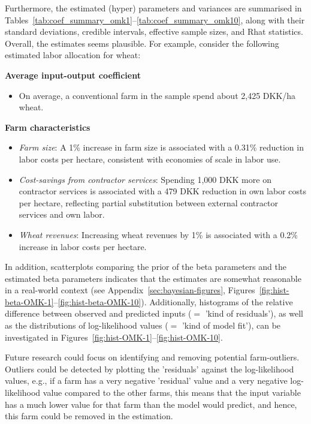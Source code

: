 \documentclass[12pt]{article}
\begin{document}
Furthermore, the estimated (hyper) parameters and variances are summarised in Tables~\ref{tab:coef_summary_omk1}--\ref{tab:coef_summary_omk10}, along with their standard deviations, credible intervals, effective sample sizes, and Rhat statistics.
Overall, the estimates seems plausible. 
For example, consider the following estimated labor allocation for wheat:

\begin{tcolorbox}[
  colback=gray!10,
  colframe=gray!50!black,
  title=Labor Costs--Wheat Estimates,
  fonttitle=\bfseries,
  arc=2mm,
  breakable
]

\noindent\textbf{Average input-output coefficient}
\begin{itemize}
    \item On average, a conventional farm in the sample spend about 2{,}425 DKK/ha wheat. 
\end{itemize}

\noindent\textbf{Farm characteristics}
\begin{itemize}
    \item \textit{Farm size}: A 1\% increase in farm size is associated with a 0.31\% reduction in labor costs per hectare, consistent with economies of scale in labor use.
    \item \textit{Cost-savings from contractor services}: Spending 1{,}000 DKK more on contractor services is associated with a 479 DKK reduction in own labor costs per hectare, reflecting partial substitution between external contractor services and own labor.
    \item \textit{Wheat revenues}: Increasing wheat revenues by 1\% is associated with a 0.2\% increase in labor costs per hectare.
\end{itemize}

\end{tcolorbox}

In addition, scatterplots comparing the prior of the beta parameters and the estimated beta parameters indicates that the estimates are somewhat reasonable in a real-world context (see Appendix~\ref{sec:bayesian-figures}, 
Figures~\ref{fig:hist-beta-OMK-1}--\ref{fig:hist-beta-OMK-10}).
Additionally, histograms of the relative difference between observed and predicted inputs ($=$ 'kind of residuals'), as well as the distributions of log-likelihood values ($=$ 'kind of model fit'), can be investigated in Figures~\ref{fig:hist-OMK-1}--\ref{fig:hist-OMK-10}.

Future research could focus on identifying and removing potential farm-outliers.
Outliers could be detected by plotting the 'residuals' against the log-likelihood values, e.g., if a farm has a very negative 'residual' value and a very negative log-likelihood value compared to the other farms, this means that the input variable has a much lower value for that farm than the model would predict, and hence, this farm could be removed in the estimation.
\end{document}
